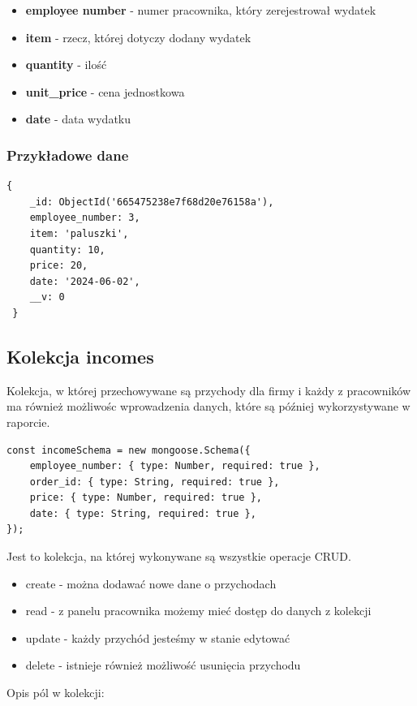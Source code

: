\documentclass[12pt]{article}
\begin{document}
\begin{itemize}
	\item \textbf{employee number} - numer pracownika, który zerejestrował wydatek
	\item \textbf{item} - rzecz, której dotyczy dodany wydatek
	\item \textbf{quantity} - ilość 
	\item \textbf{unit\_price} - cena jednostkowa
	\item \textbf{date} - data wydatku
\end{itemize}

\subsubsection{Przykładowe dane}
\begin{lstlisting}[]
 {
    _id: ObjectId('665475238e7f68d20e76158a'),
    employee_number: 3,
    item: 'paluszki',
    quantity: 10,
    price: 20,
    date: '2024-06-02',
    __v: 0
 }
\end{lstlisting}

\newpage
\begin{samepage}
\subsection{Kolekcja incomes}
Kolekcja, w której przechowywane są przychody dla firmy i każdy z pracowników ma również możliwośc wprowadzenia danych, które są później wykorzystywane w raporcie.

\begin{lstlisting}[caption={Incomes}]
const incomeSchema = new mongoose.Schema({
    employee_number: { type: Number, required: true },
    order_id: { type: String, required: true },
    price: { type: Number, required: true },
    date: { type: String, required: true },
});
\end{lstlisting}
Jest to kolekcja, na której wykonywane są wszystkie operacje CRUD.
\begin{itemize}
	\item create - można dodawać nowe dane o przychodach 
	\item read - z panelu pracownika możemy mieć dostęp do danych z kolekcji
	\item update - każdy przychód jesteśmy w stanie edytować
	\item delete - istnieje również możliwość usunięcia przychodu
\end{itemize}
\end{samepage}
Opis pól w kolekcji:
\end{document}
